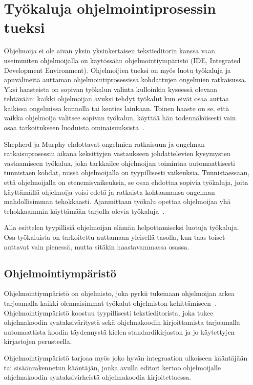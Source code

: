 \documentclass[finnish]{tktltiki2}
\theoremstyle{definition}
\theoremstyle{remark}
\begin{document}
\section{Työkaluja ohjelmointiprosessin tueksi}
Ohjelmoija ei ole aivan yksin yksinkertaisen tekstieditorin kanssa vaan useimmiten ohjelmoijalla on käytössään ohjelmointiympäristö (IDE, Integrated Development Environment). Ohjelmoijien tueksi on myös luotu työkaluja ja apuvälineitä auttaman ohjelmointiprosessissa kohdattujen ongelmien ratkaisussa.
Yksi haasteista on sopivan työkalun valinta kulloinkin kyseessä olevaan tehtävään: kaikki ohjelmoijan avuksi tehdyt työkalut kun eivät osaa auttaa kaikissa ongelmissa kunnolla tai kenties lainkaan. Toinen haaste on se, että vaikka ohjelmoija valitsee sopivan työkalun, käyttää hän todennäköisesti vain osaa tarkoitukseen luoduista ominaisuuksista~\cite{whyline}.

Shepherd ja Murphy ehdottavat ongelmien ratkaisuun ja ongelman ratkaisuprosessin aikana keksittyjen vastaukseen johdattelevien kysymysten vastaamiseen työkalua, joka tarkkailee ohjelmoijan toimintaa automaattisesti tunnistaen kohdat, missä ohjelmoijalla on tyypillisesti vaikeuksia. Tunnistaessaan, että ohjelmoijalla on etenemisvaikeuksia,
se osaa ehdottaa sopivia työkaluja, joita käyttämällä ohjelmoija voisi edetä ja ratkaista kohtaamansa ongelman mahdollisimman tehokkaasti. Ajanmittaan työkalu opettaa ohjelmoijaa yhä tehokkaammin käyttämään tarjolla olevia työkaluja~\cite{programmers-coach}.

Alla esittelen tyypillisiä ohjelmoijan elämän helpottamiseksi luotuja työkaluja. Osa työkaluista on tarkoitettu auttamaan yleisellä tasolla, kun taas toiset auttavat vain pienessä, mutta sitäkin haastavammassa osassa.

\subsection{Ohjelmointiympäristö}
Ohjelmointiympäristö on ohjelmisto, joka pyrkii tukemaan ohjelmoijan arkea tarjoamalla kaikki olennaisimmat työkalut ohjelmiston kehittämiseen~\cite{eclipse-ide}. Ohjelmointiympäristö koostuu tyypillisesti tekstieditorista, joka tukee ohjelmakoodin syntaksiväritystä sekä ohjelmakoodin kirjoittamista tarjoamalla automaattista koodin täydennystä kielen standardikirjaston ja jo käytettyjen kirjastojen perusteella.

Ohjelmointiympäristö tarjoaa myös joko hyvän integraation ulkoiseen kääntäjään tai sisäänrakennetun kääntäjän, jonka avulla editori kertoo ohjelmoijalle ohjelmakoodin syntaksivirheistä ohjelmakoodia kirjoitettaessa.
\end{document}
